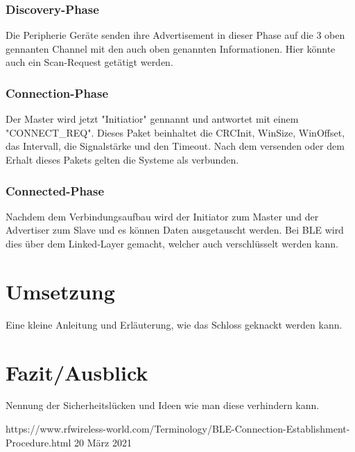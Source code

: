 \documentclass[a4paper,11pt,singlespacing]{article}
\begin{document}
		\subsubsection{Discovery-Phase}
		Die Peripherie Geräte senden ihre Advertisement in dieser Phase auf die 3 oben gennanten Channel mit den auch oben genannten Informationen. Hier könnte auch ein Scan-Request getätigt werden.
		\subsubsection{Connection-Phase}
		Der Master wird jetzt "Initiatior" gennannt und antwortet mit einem "CONNECT\_REQ". Dieses Paket beinhaltet die CRCInit, WinSize, WinOffset, das Intervall, die Signalstärke und den Timeout. Nach dem versenden oder dem Erhalt dieses Pakets gelten die Systeme als verbunden.
		\subsubsection{Connected-Phase}
		Nachdem dem Verbindungsaufbau wird der Initiator zum Master und der Advertiser zum Slave und es können Daten ausgetauscht werden. Bei BLE wird dies über dem Linked-Layer gemacht, welcher auch verschlüsselt werden kann.
		
		\subsection{}
	
	\section{Umsetzung}
		
		Eine kleine Anleitung und Erläuterung, wie das Schloss geknackt werden kann.
		
	\section{Fazit/Ausblick}
		Nennung der Sicherheitslücken und Ideen wie man diese verhindern kann.
	
	
	
	
	
	
	https://www.rfwireless-world.com/Terminology/BLE-Connection-Establishment-Procedure.html 20 März 2021
	
\end{document}
